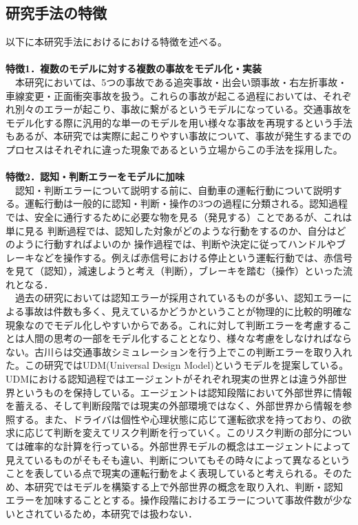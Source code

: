 \documentclass[14pt,a4j]{jsarticle}
\begin{document}
\subsection{研究手法の特徴}
以下に本研究手法におけるにおける特徴を述べる。\\\\
\textbf{特徴1．複数のモデルに対する複数の事故をモデル化・実装}\\
　本研究においては、5つの事故である追突事故・出会い頭事故・右左折事故・車線変更・正面衝突事故を扱う。これらの事故が起こる過程においては、それぞれ別々のエラーが起こり、事故に繋がるというモデルになっている。交通事故をモデル化する際に汎用的な単一のモデルを用い様々な事故を再現するという手法もあるが、本研究では実際に起こりやすい事故について、事故が発生するまでのプロセスはそれぞれに違った現象であるという立場からこの手法を採用した。\\\\
\textbf{特徴2．認知・判断エラーをモデルに加味}\\
　認知・判断エラーについて説明する前に、自動車の運転行動について説明する。運転行動は一般的に認知・判断・操作の3つの過程に分類される\cite{ITARDA2005}。認知過程では、安全に通行するために必要な物を見る（発見する）ことであるが、これは単に見る
判断過程では、認知した対象がどのような行動をするのか、自分はどのように行動すればよいのか
操作過程では、判断や決定に従ってハンドルやブレーキなどを操作する。例えば赤信号における停止という運転行動では、赤信号を見て（認知），減速しようと考え（判断），ブレーキを踏む（操作）といった流れとなる．\\
　過去の研究においては認知エラーが採用されているものが多い、認知エラーによる事故は件数も多く、見えているかどうかということが物理的に比較的明確な現象なのでモデル化しやすいからである。これに対して判断エラーを考慮することは人間の思考の一部をモデル化することとなり、様々な考慮をしなければならない。古川らは交通事故シミュレーションを行う上でこの判断エラーを取り入れた\cite{Furukawa2009}。この研究ではUDM(Universal Design Model)というモデルを提案している。UDMにおける認知過程ではエージェントがそれぞれ現実の世界とは違う外部世界というものを保持している。エージェントは認知段階において外部世界に情報を蓄える、そして判断段階では現実の外部環境ではなく、外部世界から情報を参照する。また、ドライバは個性や心理状態に応じて運転欲求を持っており、の欲求に応じて判断を変えてリスク判断を行っていく。このリスク判断の部分については確率的な計算を行っている。外部世界モデルの概念はエージェントによって見えているものがそもそも違い、判断についてもその時々によって異なるということを表している点で現実の運転行動をよく表現していると考えられる。そのため、本研究ではモデルを構築する上で外部世界の概念を取り入れ、判断・認知エラーを加味することとする。操作段階におけるエラーについて事故件数が少ないとされているため，本研究では扱わない．\\\\
\end{document}
